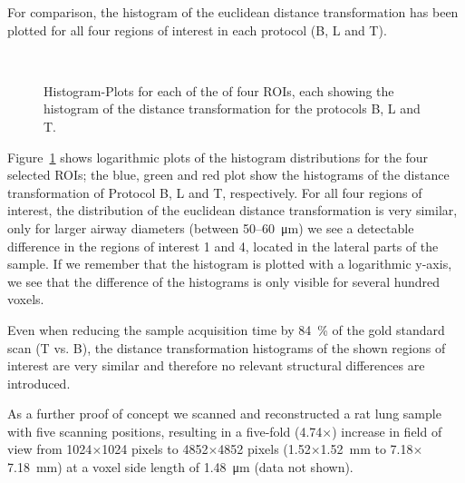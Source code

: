 For comparison, the histogram of the euclidean distance transformation has been plotted for all four regions of interest in each protocol (B, L and T).

\renewcommand{\imsize}{.5\columnwidth}
\begin{figure}
	\centering
	\caption{Histogram-Plots for each of the of four ROIs, each showing the histogram of the distance transformation for the protocols B, L and T.}%
	\ifiucr%
		\\%
	\else
	\fi	
	\label{fig:DTFplots}
\end{figure}

Figure~\ref{fig:DTFplots} shows logarithmic plots of the histogram distributions for the four selected ROIs; the blue, green and red plot show the histograms of the distance transformation of Protocol B, L and T, respectively. For all four regions of interest, the distribution of the euclidean distance transformation is very similar, only for larger airway diameters (between 50--\SI{60}{\micro\meter}) we see a detectable difference in the regions of interest 1 and 4, located in the lateral parts of the sample. If we remember that the histogram is plotted with a logarithmic y-axis, we see that the difference of the histograms is only visible for several hundred voxels.

Even when reducing the sample acquisition time by \SI{84}{\percent} of the gold standard scan (T vs. B), the distance transformation histograms of the shown regions of interest are very similar and therefore no relevant structural differences are introduced.

As a further proof of concept we scanned and reconstructed a rat lung sample with five scanning positions, resulting in a five-fold (4.74$\times$) increase in field of view from 1024$\times$1024 pixels to 4852$\times$4852 pixels (1.52$\times$\SI{1.52}{\milli\meter} to 7.18$\times$\SI{7.18}{\milli\meter}) at a voxel side length of \SI{1.48}{\micro\meter} (data not shown).